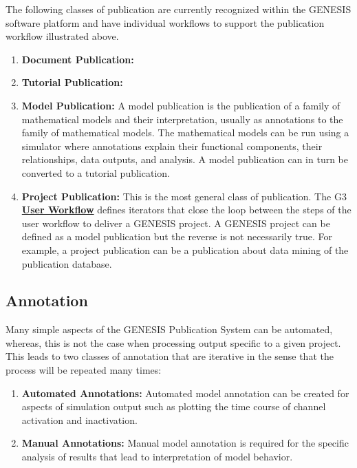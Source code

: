 \documentclass[12pt]{article}
\begin{document}
The following classes of publication are currently recognized within the GENESIS software platform and have individual workflows to support the publication workflow illustrated above.

\begin{enumerate}
   \item {\bf Document Publication:}
   \item {\bf Tutorial Publication:}
   \item {\bf Model Publication:} A model publication is the publication of a family of mathematical models and their interpretation, usually as annotations to the family of mathematical models. The mathematical models can be run using a simulator where annotations explain their functional components, their relationships, data outputs, and analysis. A model publication can in turn be converted to a tutorial publication.
   \item{\bf Project Publication:} This is the most general class of publication. The G3 \href{../workflow-user/workflow-user.tex}{\bf User Workflow} defines iterators that close the loop between the steps of the user workflow to deliver a GENESIS project. A GENESIS project can be defined as  a model publication but the reverse is not necessarily true. For example, a project publication can be a publication about data mining of the publication database.
\end{enumerate}

\subsection*{Annotation}

Many simple aspects of the GENESIS Publication System can be automated, whereas, this is not the case when processing output specific to a given project. This leads to two classes of annotation that are iterative in the sense that the process will be repeated many times:

\begin{enumerate}
   \item {\bf Automated Annotations:} Automated model annotation can be created for aspects of simulation output such as plotting the time course of channel activation and inactivation.
   \item {\bf Manual Annotations:} Manual model annotation is required for the specific analysis of results that lead to interpretation of model behavior.
\end{enumerate}
\end{document}

